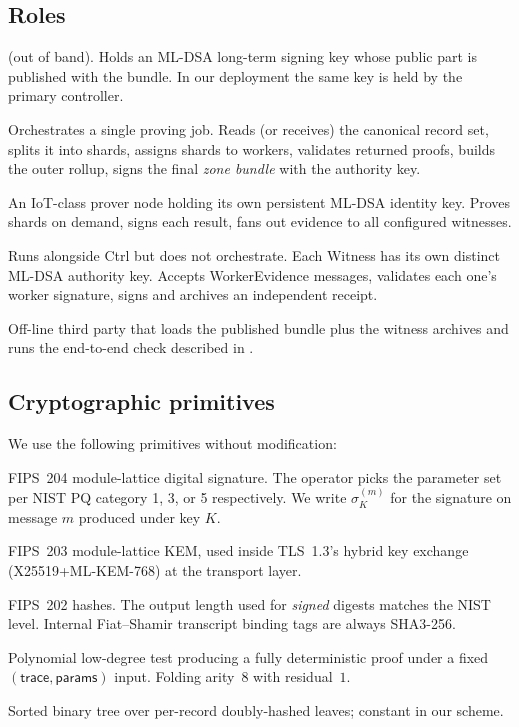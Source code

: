 \documentclass[11pt,a4paper]{article}
\theoremstyle{definition}
\theoremstyle{plain}
\newcommand{\msg}[1]{\textsf{#1}}
\newcommand{\ctrl}{\msg{Ctrl}}
\newcommand{\worker}{\msg{Worker}}
\newcommand{\witness}{\msg{Witness}}
\newcommand{\sig}[2]{\ensuremath{\sigma_{#1}^{(#2)}}}
\begin{document}
\subsection{Roles}

\begin{description}[leftmargin=*,style=nextline]
  \item[Authority key holder] (out of band).  Holds an ML-DSA long-term
    signing key whose public part is published with the bundle.  In our
    deployment the same key is held by the primary controller.
  \item[Primary controller \ctrl] Orchestrates a single proving job.
    Reads (or receives) the canonical record set, splits it into
    shards, assigns shards to workers, validates returned proofs,
    builds the outer rollup, signs the final \emph{zone bundle} with
    the authority key.
  \item[Worker \worker] An IoT-class prover node holding its own
    persistent ML-DSA identity key.  Proves shards on demand, signs
    each result, fans out evidence to all configured witnesses.
  \item[Witness controller \witness] Runs alongside \ctrl{} but does
    not orchestrate.  Each \witness{} has its own distinct ML-DSA
    authority key.  Accepts \msg{WorkerEvidence} messages, validates
    each one's worker signature, signs and archives an independent
    receipt.
  \item[Verifier] Off-line third party that loads the published
    bundle plus the witness archives and runs the end-to-end check
    described in .
\end{description}

\subsection{Cryptographic primitives}

We use the following primitives without modification:

\begin{description}[leftmargin=*]
  \item[ML-DSA-44/65/87] FIPS~204 module-lattice digital signature.  The
    operator picks the parameter set per NIST PQ category 1, 3, or 5
    respectively.  We write $\sig{K}{m}$ for the signature on message
    $m$ produced under key $K$.
  \item[ML-KEM-768] FIPS~203 module-lattice KEM, used inside
    TLS~1.3's hybrid key exchange (X25519+ML-KEM-768) at the
    transport layer.
  \item[SHA3-256/384/512] FIPS~202 hashes.  The output length used for
    \emph{signed} digests matches the NIST level.  Internal
    Fiat--Shamir transcript binding tags are always SHA3-256.
  \item[STIR] Polynomial low-degree test producing a fully
    deterministic proof under a fixed $(\textsf{trace},
    \textsf{params})$ input.  Folding arity~$8$ with residual~$1$.
  \item[Merkle (SHA3-256, domain-separated)] Sorted binary tree
    over per-record doubly-hashed leaves; constant in our scheme.
\end{description}
\end{document}
